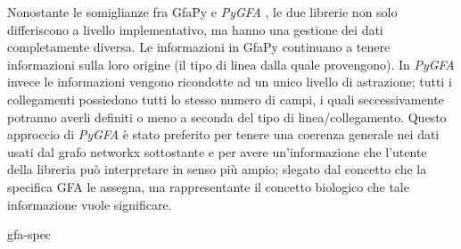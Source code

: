 \documentclass[11pt, a4paper]{book}
\newcommand {\pygfa} {\textit{PyGFA }}
\begin{document}
Nonostante le somiglianze fra GfaPy e \pygfa, le due librerie non solo differiscono
a livello implementativo, ma hanno una gestione dei dati completamente diversa.
Le informazioni in GfaPy continuano a tenere informazioni sulla loro origine (il tipo
di linea dalla quale provengono). In \pygfa invece le informazioni vengono	
ricondotte ad un unico livello di astrazione; tutti i collegamenti possiedono tutti
lo stesso numero di campi, i quali seccessivamente potranno averli definiti o meno
a seconda del tipo di linea/collegamento. Questo approccio di \pygfa è stato
preferito per tenere una coerenza generale nei dati usati dal grafo networkx
sottostante e per avere un'informazione che l'utente della libreria può interpretare
in senso più ampio; slegato dal concetto che la specifica GFA le assegna, ma
rappresentante il concetto biologico che tale informazione vuole significare.



 {gfa-spec}

\printbibliography

\listoftodos[TODO]
\end{document}
